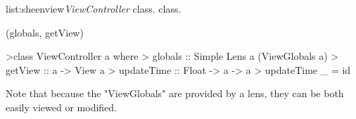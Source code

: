 \vspace{-0.5em}
\begin{listing}{list:sheenview}{\emph{ViewController} class.}{ class.}{}
\end{listing}\vspace{-1.5em}

\functions(globals, getView)
\begin{haskell}

>class ViewController a where
>  globals :: Simple Lens a (ViewGlobals a)
>  getView :: a -> View a
>  updateTime :: Float -> a -> a
>  updateTime _ = id

\end{haskell}
\noindent 
Note that because the "ViewGlobals" are provided by a lens, they can be both easily viewed or modified. 


